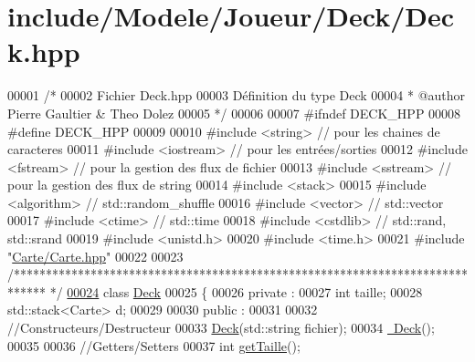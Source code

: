 \hypertarget{_deck_8hpp_source}{\section{include/\-Modele/\-Joueur/\-Deck/\-Deck.hpp}
}

\begin{DoxyCode}
00001 \textcolor{comment}{/* }
00002 \textcolor{comment}{   Fichier Deck.hpp}
00003 \textcolor{comment}{   Définition du type Deck}
00004 \textcolor{comment}{* @author Pierre Gaultier & Theo Dolez}
00005 \textcolor{comment}{*/}
00006 
00007 \textcolor{preprocessor}{#ifndef DECK\_HPP}
00008 \textcolor{preprocessor}{}\textcolor{preprocessor}{#define DECK\_HPP}
00009 \textcolor{preprocessor}{}
00010 \textcolor{preprocessor}{#include <string>} \textcolor{comment}{// pour les chaines de caracteres}
00011 \textcolor{preprocessor}{#include <iostream>} \textcolor{comment}{// pour les entrées/sorties}
00012 \textcolor{preprocessor}{#include <fstream>} \textcolor{comment}{// pour la gestion des flux de fichier}
00013 \textcolor{preprocessor}{#include <sstream>} \textcolor{comment}{// pour la gestion des flux de string}
00014 \textcolor{preprocessor}{#include <stack>}
00015 \textcolor{preprocessor}{#include <algorithm>}    \textcolor{comment}{// std::random\_shuffle}
00016 \textcolor{preprocessor}{#include <vector>}       \textcolor{comment}{// std::vector}
00017 \textcolor{preprocessor}{#include <ctime>}        \textcolor{comment}{// std::time}
00018 \textcolor{preprocessor}{#include <cstdlib>}      \textcolor{comment}{// std::rand, std::srand}
00019 \textcolor{preprocessor}{#include <unistd.h>}
00020 \textcolor{preprocessor}{#include <time.h>}
00021 \textcolor{preprocessor}{#include "\hyperlink{_carte_8hpp}{Carte/Carte.hpp}"}
00022 
00023 \textcolor{comment}{/*****************************************************************************
      */}
\hypertarget{_deck_8hpp_source_l00024}{}\hyperlink{class_deck}{00024} \textcolor{keyword}{class }\hyperlink{class_deck}{Deck}
00025 \{
00026    \textcolor{keyword}{private} :
00027         \textcolor{keywordtype}{int} taille;
00028         std::stack<Carte> d;
00029       
00030    \textcolor{keyword}{public} :
00031     
00032     \textcolor{comment}{//Constructeurs/Destructeur}
00033     \hyperlink{class_deck_abd58d9e32c8bd9fe7a05a12a4882d94c}{Deck}(std::string fichier);
00034     \hyperlink{class_deck_a7d1331cc558c302fdf44e5ae8aae1a95}{~Deck}();
00035     
00036     \textcolor{comment}{//Getters/Setters}
00037     \textcolor{keywordtype}{int} \hyperlink{class_deck_a34272f22ad41d349f7b347c07fd0cbb4}{getTaille}();

\end{DoxyCode}
